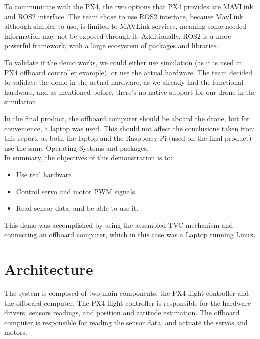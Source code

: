 \documentclass[a4paper]{article}
\begin{document}
To communicate with the PX4, the two options that PX4 provides are MAVLink and ROS2 interface. 
The team chose to use ROS2 interface, because MavLink although simpler to use, is limited to MAVLink services, meaning some needed information may not be exposed through it. 
Additionally, ROS2 is a more powerful framework, with a large ecosystem of packages and libraries. 

To validate if the demo works, we could either use simulation (as it is used in PX4 offboard controller example), or use the actual hardware. 
The team decided to validate the demo in the actual hardware, as we already had the functional hardware, and as mentioned before, there's no native support for our drone in the simulation.

In the final product, the offboard computer should be aboard the drone, but for convenience, a laptop was used. 
This should not affect the conclusions taken from this report, as both the laptop and the Raspberry Pi (used on the final product) use the same Operating Systems and packages. \\

In summary, the objectives of this demonstration is to: 

\begin{itemize}
    \item Use real hardware 
    \item Control servo and motor PWM signals. 
    \item Read sensor data, and be able to use it. 
\end{itemize}

This demo was accomplished by using the assembled TVC mechanism and connecting an offboard computer, which in this case was a Laptop running Linux. 



\section{Architecture}


The system is composed of two main components: the PX4 flight controller and the offboard computer. 
The PX4 flight controller is responsible for the hardware drivers, sensors readings, and position and attitude estimation. 
The offboard computer is responsible for reading the sensor data, and actuate the servos and motors. 
\end{document}
